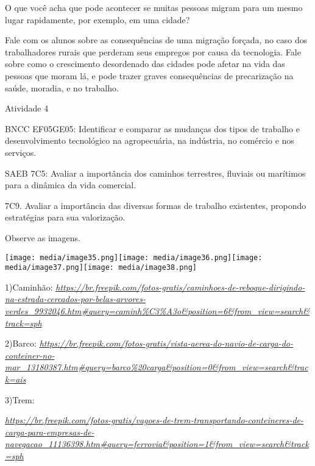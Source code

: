 O que você acha que pode acontecer se muitas pessoas migram para um
mesmo lugar rapidamente, por exemplo, em uma cidade?

Fale com os alunos sobre as consequências de uma migração forçada, no
caso dos trabalhadores rurais que perderam seus empregos por causa da
tecnologia. Fale sobre como o crescimento desordenado das cidades pode
afetar na vida das pessoas que moram lá, e pode trazer graves
consequências de precarização na saúde, moradia, e no trabalho.

Atividade 4

BNCC EF05GE05: Identificar e comparar as mudanças dos tipos de trabalho
e desenvolvimento tecnológico na agropecuária, na indústria, no comércio
e nos serviços.

SAEB 7C5: Avaliar a importância dos caminhos terrestres, fluviais ou
marítimos para a dinâmica da vida comercial.

7C9. Avaliar a importância das diversas formas de trabalho existentes,
propondo estratégias para sua valorização.

Observe as imagens.

\texttt{[image: media/image35.png]}\texttt{[image: media/image36.png]}\texttt{[image: media/image37.png]}\texttt{[image: media/image38.png]}

1)Caminhão:
\href{https://br.freepik.com/fotos-gratis/caminhoes-de-reboque-dirigindo-na-estrada-cercados-por-belas-arvores-verdes_9932046.htm\#query=caminh\%C3\%A3o\&position=6\&from_view=search\&track=sph}{\emph{https://br.freepik.com/fotos-gratis/caminhoes-de-reboque-dirigindo-na-estrada-cercados-por-belas-arvores-verdes\_9932046.htm\#query=caminh\%C3\%A3o\&position=6\&from\_view=search\&track=sph}}

2)Barco:
\href{https://br.freepik.com/fotos-gratis/vista-aerea-do-navio-de-carga-do-conteiner-no-mar_13180387.htm\#query=barco\%20carga\&position=0\&from_view=search\&track=ais}{\emph{https://br.freepik.com/fotos-gratis/vista-aerea-do-navio-de-carga-do-conteiner-no-mar\_13180387.htm\#query=barco\%20carga\&position=0\&from\_view=search\&track=ais}}

3)Trem:

\href{https://br.freepik.com/fotos-gratis/vagoes-de-trem-transportando-conteineres-de-carga-para-empresas-de-navegacao_11136398.htm\#query=ferrovia\&position=1\&from_view=search\&track=sph}{\emph{https://br.freepik.com/fotos-gratis/vagoes-de-trem-transportando-conteineres-de-carga-para-empresas-de-navegacao\_11136398.htm\#query=ferrovia\&position=1\&from\_view=search\&track=sph}}

